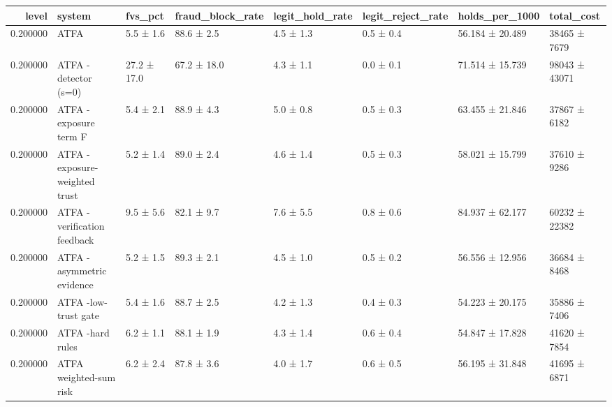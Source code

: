 \begin{tabular}{rlllllll}
\toprule
level & system & fvs\_pct & fraud\_block\_rate & legit\_hold\_rate & legit\_reject\_rate & holds\_per\_1000 & total\_cost \\
\midrule
0.200000 & ATFA & 5.5 ± 1.6 & 88.6 ± 2.5 & 4.5 ± 1.3 & 0.5 ± 0.4 & 56.184 ± 20.489 & 38465 ± 7679 \\
0.200000 & ATFA -detector (s=0) & 27.2 ± 17.0 & 67.2 ± 18.0 & 4.3 ± 1.1 & 0.0 ± 0.1 & 71.514 ± 15.739 & 98043 ± 43071 \\
0.200000 & ATFA -exposure term F & 5.4 ± 2.1 & 88.9 ± 4.3 & 5.0 ± 0.8 & 0.5 ± 0.3 & 63.455 ± 21.846 & 37867 ± 6182 \\
0.200000 & ATFA -exposure-weighted trust & 5.2 ± 1.4 & 89.0 ± 2.4 & 4.6 ± 1.4 & 0.5 ± 0.3 & 58.021 ± 15.799 & 37610 ± 9286 \\
0.200000 & ATFA -verification feedback & 9.5 ± 5.6 & 82.1 ± 9.7 & 7.6 ± 5.5 & 0.8 ± 0.6 & 84.937 ± 62.177 & 60232 ± 22382 \\
0.200000 & ATFA -asymmetric evidence & 5.2 ± 1.5 & 89.3 ± 2.1 & 4.5 ± 1.0 & 0.5 ± 0.2 & 56.556 ± 12.956 & 36684 ± 8468 \\
0.200000 & ATFA -low-trust gate & 5.4 ± 1.6 & 88.7 ± 2.5 & 4.2 ± 1.3 & 0.4 ± 0.3 & 54.223 ± 20.175 & 35886 ± 7406 \\
0.200000 & ATFA -hard rules & 6.2 ± 1.1 & 88.1 ± 1.9 & 4.3 ± 1.4 & 0.6 ± 0.4 & 54.847 ± 17.828 & 41620 ± 7854 \\
0.200000 & ATFA weighted-sum risk & 6.2 ± 2.4 & 87.8 ± 3.6 & 4.0 ± 1.7 & 0.6 ± 0.5 & 56.195 ± 31.848 & 41695 ± 6871 \\
\bottomrule
\end{tabular}
